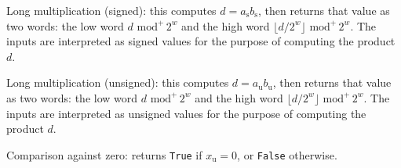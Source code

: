 \documentclass{llncs}
\newcommand{\umod}[2]{#1 \,\,\text{mod}^{+}\, #2}
\begin{document}
\begin{codedesc}
    \item[longmul\_s(a, b)] Long multiplication (signed): this computes
    $d = a_\text{s} b_\text{s}$, then returns that value as two words:
    the low word $\umod{d}{2^w}$ and the high word
    $\umod{\lfloor d/2^w\rfloor}{2^w}$. The inputs are interpreted
    as signed values for the purpose of computing the product $d$.

    \item[longmul\_u(a, b)] Long multiplication (unsigned): this computes
    $d = a_\text{u} b_\text{u}$, then returns that value as two words:
    the low word $\umod{d}{2^w}$ and the high word
    $\umod{\lfloor d/2^w\rfloor}{2^w}$. The inputs are interpreted
    as unsigned values for the purpose of computing the product $d$.

    \item[is\_zero(x)] Comparison against zero: returns \verb+True+ if
    $x_\text{u} = 0$, or \verb+False+ otherwise.

\end{codedesc}
\end{document}
